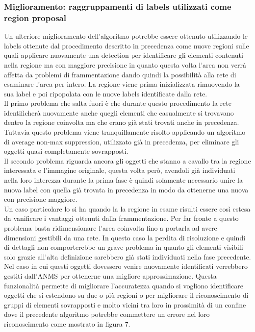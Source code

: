 \subsubsection{Miglioramento: raggruppamenti di labels utilizzati come region proposal}
Un ulteriore miglioramento dell'algoritmo potrebbe essere ottenuto utilizzando le labels ottenute dal procedimento descritto in precedenza come nuove regioni sulle quali applicare nuovamente una detection per identificare gli elementi contenuti nella regione ma con maggiore precisione in quanto questa volta l'area non verrà affetta da problemi di frammentazione dando quindi la possibilità alla rete di esaminare l'area per intero. La regione viene prima inizializzata rimuovendo la sua label e poi ripopolata con le nuove labels identificate dalla rete.\\
Il primo problema che salta fuori è che durante questo procedimento la rete identificherà nuovamente anche quegli elementi che casualmente si trovavano dentro la regione coinvolta ma che erano già stati trovati anche in precedenza. Tuttavia questo problema viene tranquillamente risolto applicando un algoritmo di average non-max suppression, utilizzato già in precedenza, per eliminare gli oggetti quasi completamente sovrapposti.\\
Il secondo problema riguarda ancora gli oggetti che stanno a cavallo tra la regione interessata e l'immagine originale, questa volta però, avendoli già individuati nella loro interezza durante la prima fase è quindi solamente necessario unire la nuova label con quella già trovata in precedenza in modo da ottenerne una nuova con precisione maggiore.\\
Un caso particolare lo si ha quando la la regione in esame risulti essere così estesa da vanificare i vantaggi ottenuti dalla frammentazione. Per far fronte a questo problema basta ridimensionare l'area coinvolta fino a portarla ad avere dimensioni gestibili da una rete. In questo caso la perdita di risoluzione e quindi di dettagli non comporterebbe un grave problema in quanto gli elementi visibili solo grazie all'alta definizione sarebbero già stati individuati nella fase precedente. Nel caso in cui questi oggetti dovessero venire nuovamente identificati verrebbero gestiti dall'ANMS per ottenerne una migliore approssimazione. Questa funzionalità permette di migliorare l'accuratezza quando si vogliono identificare oggetti che si estendono su due o più regioni o per migliorare il riconoscimento di gruppi di elementi sovrapposti e molto vicini tra loro in prossimità di un confine dove il precedente algoritmo potrebbe commettere un errore nel loro riconoscimento come mostrato in figura 7.
